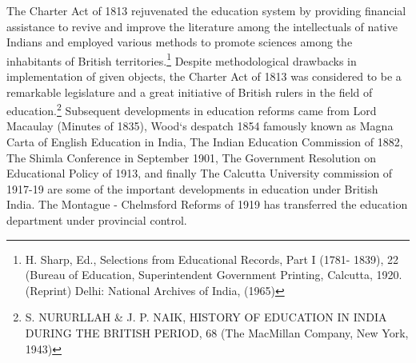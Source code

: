 \begin{multicols}{2}
\noi
The Charter Act of 1813 rejuvenated the education system by providing financial assistance
to revive and improve the literature among the intellectuals of native Indians and employed
various methods to promote sciences among the inhabitants of British territories.\footnote{H. Sharp, Ed., Selections from Educational Records, Part I (1781- 1839), 22 (Bureau of Education, Superintendent Government Printing, Calcutta, 1920. (Reprint) Delhi: National Archives of India, (1965)} Despite methodological drawbacks in implementation of given objects, the Charter Act of 1813 was considered to be a remarkable legislature and a great initiative of British rulers in the field of education.\footnote{S. NURURLLAH \& J. P. NAIK, HISTORY OF EDUCATION IN INDIA DURING THE BRITISH
PERIOD, 68 (The MacMillan Company, New York, 1943)} Subsequent developments in education reforms came from Lord Macaulay (Minutes of 1835), Wood‘s despatch 1854 famously known as Magna Carta of English
Education in India, The Indian Education Commission of 1882, The Shimla Conference in
September 1901, The Government Resolution on Educational Policy of 1913, and finally The
Calcutta University commission of 1917-19 are some of the important developments in
education under British India. The Montague - Chelmsford Reforms of 1919 has transferred
the education department under provincial control.



\end{multicols}

